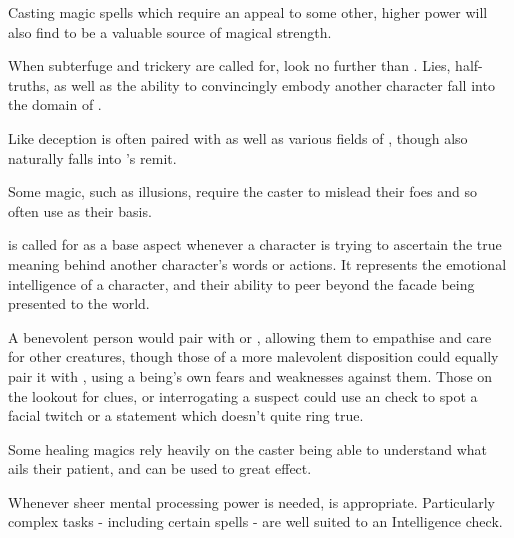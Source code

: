 Casting magic spells which require an appeal to some other, higher power will also find  to be a valuable source of magical strength. 



When subterfuge and trickery are called for, look no further than . Lies, half-truths, as well as the ability to convincingly embody another character fall into the domain of . 

Like  deception is often paired with  as well as various fields of , though  also naturally falls into 's remit. 

Some magic, such as illusions, require the caster to mislead their foes and so often use  as their basis. 



 is called for as a base aspect whenever a character is trying to ascertain the true meaning behind another character's words or actions. It represents the emotional intelligence of a character, and their ability to peer beyond the facade being presented to the world. 

A benevolent person would pair  with  or , allowing them to empathise and care for other creatures, though those of a more malevolent disposition could equally pair it with , using a being's own fears and weaknesses against them. Those on the lookout for clues, or interrogating a suspect could use an  check to spot a facial twitch or a statement which doesn't quite ring true.

Some healing magics rely heavily on the caster being able to understand what ails their patient, and  can be used to great effect.  



Whenever sheer mental processing power is needed,  is appropriate. Particularly complex tasks - including certain spells - are well suited to an Intelligence check.

